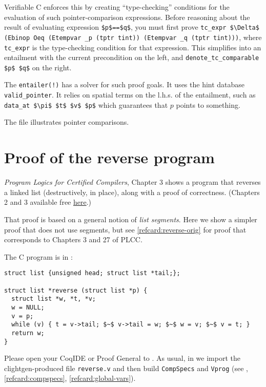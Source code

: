 \documentclass[12pt,fleqn,openany,oneside,showtrims]{memoir}
\begin{document}
Verifiable C enforces this by creating ``type-checking'' conditions
for the evaluation of such pointer-comparison expressions.
Before reasoning about the result of evaluating expression
\lstinline{$p$==$q$}, you must first prove\newline
\lstinline{tc_expr $\Delta$ (Ebinop Oeq (Etempvar _p (tptr tint)) (Etempvar _q (tptr tint)))},
where \lstinline{tc_expr} is the type-checking condition for that expression.
This simplifies into an entailment
with the current precondition on the left,
and \lstinline{denote_tc_comparable $p$ $q$} on the right.

The \lstinline{entailer(!)} has a solver for such proof goals.
It uses the hint database \lstinline{valid_pointer}.
It relies on spatial terms on the l.h.s. of the entailment,
such as \lstinline{data_at $\pi$ $t$ $v$ $p$} which guarantees
that $p$ points to something.

The file  illustrates pointer comparisons.

\chapter{Proof of the \textsf{reverse} program}

\emph{Program Logics for Certified Compilers},
Chapter 3
shows a program that reverses a linked list (destructively, in place),
along with a proof of correctness.
(Chapters 2 and 3 available free
\href{http://vst.cs.princeton.edu/download/PLCC-to-chapter-3.pdf#page=20}{here}.)

That proof is based on a general notion of \emph{list segments}.
Here we show a simpler proof that does not use segments, but see
\autoref{refcard:reverse-orig} for proof that corresponds
to Chapters 3 and 27 of PLCC.

The C program is in :
\begin{lstlisting}
struct list {unsigned head; struct list *tail;};

struct list *reverse (struct list *p) {
  struct list *w, *t, *v;
  w = NULL;
  v = p;
  while (v) { t = v->tail; $~$ v->tail = w; $~$ w = v; $~$ v = t; }
  return w;
}
\end{lstlisting}
\vspace{-2ex}

Please open your CoqIDE or Proof General to
.
As usual, in 
we import the clightgen-produced file
\lstinline{reverse.v} and then build \lstinline{CompSpecs} and \lstinline{Vprog}
(see , \autoref{refcard:compspecs},
\autoref{refcard:global-vars}).
\end{document}
